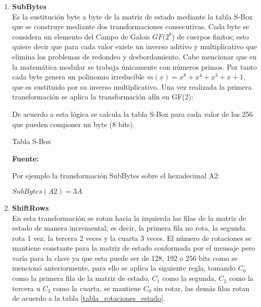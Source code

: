 \documentclass[../main/main.tex]{subfiles}
\begin{document}
    \begin{enumerate}[label=\textbf{\arabic*}.]
      \item \textbf{SubBytes} \\
        Es la sustitución byte a byte de la matriz de estado mediante la tabla S-Box que se construye mediante dos transformaciones consecutivas. Cada byte se considera un elemento del Campo de Galois $GF(2^8$) de cuerpos finitos; esto quiere decir que para cada valor existe un inverso aditivo y multiplicativo que elimina los problemas de redondeo y desbordamiento. Cabe mencionar que en la matemática modular se trabaja únicamente con números primos. Por tanto cada byte genera un polinomio irreducible $m(x) = x^8 + x^4 + x^3 + x + 1$, que es sustituido por su inverso multiplicativo. Una vez realizada la primera transformación se aplica la transformación afín en GF(2):

        

        De acuerdo a esta lógica se calcula la tabla S-Box para cada valor de los 256 que pueden componer un byte (8 bits).

        \begin{table}[H]
          \scriptsize
          \centering
          \caption{Tabla S-Box}
          
          \caption*{\textbf{Fuente:} \cite{report:seguridad_europea_eeuu}}
        \end{table}

        Por ejemplo la transformación SubBytes sobre el hexadecimal A2:

        \begin{center}
          $SubBytes(A2) = 3A$
        \end{center}

      \item \textbf{ShiftRows} \\
        En esta transformación se rotan hacia la izquierda las filas de la matriz de estado de manera incremental; es decir, la primera fila no rota, la segunda rota 1 vez, la tercera 2 veces y la cuarta 3 veces. El número de rotaciones se mantiene constante para la matriz de estado conformada por el mensaje pero varía para la clave ya que esta puede ser de 128, 192 o 256 bits como se mencionó anteriormente, para ello se aplica la siguiente regla, tomando $C_0$ como la primera fila de la matriz de estado, $C_1$ como la segunda, $C_2$ como la tercera u $C_3$ como la cuarta, se mantiene $C_0$ sin rotar, las demás filas rotan de acuerdo a la tabla \ref{tabla_rotaciones_estado}.


\end{enumerate}
\end{document}
